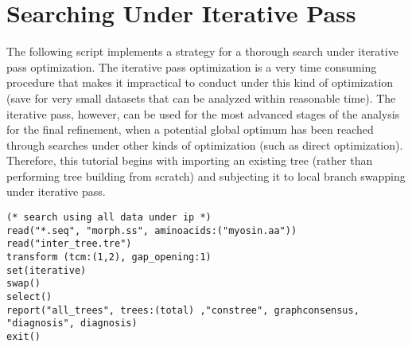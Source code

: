 \section{Searching Under Iterative Pass}{\label{tutorial2}}
The following script implements a strategy for a thorough search under iterative pass optimization. The iterative pass optimization is a very time consuming procedure that makes it impractical to conduct under this kind of optimization (save for very small datasets that can be analyzed within reasonable time). The iterative pass, however, can be used for the most advanced stages of the analysis for the final refinement, when a potential global optimum has been reached through searches under other kinds of optimization (such as direct optimization). Therefore, this tutorial begins with importing an existing tree (rather than performing tree building from scratch) and subjecting it to local branch swapping under iterative pass.

\begin{verbatim}
(* search using all data under ip *)
read("*.seq", "morph.ss", aminoacids:("myosin.aa"))
read("inter_tree.tre")
transform (tcm:(1,2), gap_opening:1)
set(iterative)
swap()
select()
report("all_trees", trees:(total) ,"constree", graphconsensus,
"diagnosis", diagnosis)
exit()
\end{verbatim}

